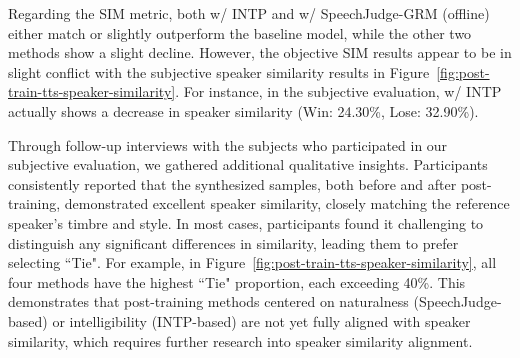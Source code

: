 \documentclass[]{bytedance_seed}
\begin{document}
Regarding the SIM metric, both w/ INTP and w/ SpeechJudge-GRM (offline) either match or slightly outperform the baseline model, while the other two methods show a slight decline. However, the objective SIM results appear to be in slight conflict with the subjective speaker similarity results in Figure~\ref{fig:post-train-tts-speaker-similarity}. For instance, in the subjective evaluation, w/ INTP actually shows a decrease in speaker similarity (Win: 24.30\%, Lose: 32.90\%).

Through follow-up interviews with the subjects who participated in our subjective evaluation, we gathered additional qualitative insights. Participants consistently reported that the synthesized samples, both before and after post-training, demonstrated excellent speaker similarity, closely matching the reference speaker's timbre and style. In most cases, participants found it challenging to distinguish any significant differences in similarity, leading them to prefer selecting ``Tie". For example, in Figure~\ref{fig:post-train-tts-speaker-similarity}, all four methods have the highest ``Tie" proportion, each exceeding 40\%. This demonstrates that post-training methods centered on naturalness (SpeechJudge-based) or intelligibility (INTP-based) are not yet fully aligned with speaker similarity, which requires further research into speaker similarity alignment.
\end{document}

